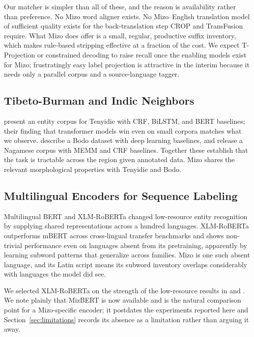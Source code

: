 \documentclass[acmsmall,screen,review]{acmart}
\begin{document}
Our matcher is simpler than all of these, and the reason is availability rather
than preference. No Mizo word aligner exists. No Mizo--English translation model
of sufficient quality exists for the back-translation step CROP and TransFusion
require. What Mizo does offer is a small, regular, productive suffix inventory,
which makes rule-based stripping effective at a fraction of the cost. We expect
T-Projection or constrained decoding to raise recall once the enabling models
exist for Mizo; frustratingly easy label projection
\citep{wu2022frustratingly} is attractive in the interim because it needs only a
parallel corpus and a source-language tagger.

\subsection{Tibeto-Burman and Indic Neighbors}
\label{sec:related:indic}

\citet{angami2025tenyidie} present an entity corpus for Tenyidie with CRF,
BiLSTM, and BERT baselines; their finding that transformer models win even on
small corpora matches what we observe. \citet{narzary2024bodo} describe a Bodo
dataset with deep learning baselines, and \citet{islam2025nagamese} release a
Nagamese corpus with MEMM and CRF baselines. Together these establish that the
task is tractable across the region given annotated data. Mizo shares the
relevant morphological properties with Tenyidie and Bodo.

\subsection{Multilingual Encoders for Sequence Labeling}
\label{sec:related:transformers}

Multilingual BERT \citep{devlin2019bert} and XLM-RoBERTa
\citep{conneau2020xlmr} changed low-resource entity recognition by supplying
shared representations across a hundred languages. XLM-RoBERTa outperforms mBERT
across cross-lingual transfer benchmarks and shows non-trivial performance even
on languages absent from its pretraining, apparently by learning subword
patterns that generalize across families. Mizo is one such absent language, and
its Latin script means its subword inventory overlaps considerably with
languages the model did see.

We selected XLM-RoBERTa on the strength of the low-resource results in
\citet{adelani2022masakhaner} and \citet{mhaske2023naamapadam}. We note plainly
that MizBERT \citep{lalramhluna2024mizbert} is now available and is the natural
comparison point for a Mizo-specific encoder; it postdates the experiments
reported here and Section~\ref{sec:limitations} records its absence as a
limitation rather than arguing it away.
\end{document}
